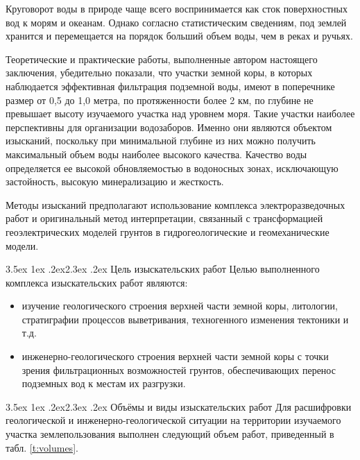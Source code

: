 \documentclass[a4paper,12pt]{article} %
\makeatletter
\renewcommand\section{\@startsection {section}{1}{\parindent}%
	{3.5ex \@plus 1ex \@minus .2ex}{2.3ex \@plus.2ex}%
	{\normalfont\hyphenpenalty=10000\Large\bfseries}}
\makeatother
\begin{document}
Круговорот воды в природе чаще всего воспринимается как сток поверхностных вод к морям и океанам. Однако согласно статистическим сведениям, под землей хранится и перемещается на порядок больший объем воды, чем в реках и ручьях.

Теоретические и практические работы, выполненные автором настоящего заключения, убедительно показали, что участки земной коры, в которых наблюдается эффективная фильтрация подземной воды, имеют в поперечнике размер от 0,5 до 1,0 метра, по протяженности более 2 км, по глубине не превышает высоту изучаемого участка над уровнем моря. Такие участки наиболее перспективны для организации водозаборов. Именно они являются объектом изысканий, поскольку при минимальной глубине из них можно получить максимальный объем воды наиболее высокого качества. Качество воды определяется ее высокой обновляемостью в водоносных зонах, исключающую застойность, высокую минерализацию и жесткость.

Методы изысканий предполагают использование комплекса электроразведочных работ и оригинальный метод интерпретации, связанный с трансформацией геоэлектрических моделей грунтов в гидрогеологические и геомеханические модели.

\section{Цель изыскательских работ}
Целью выполненного комплекса изыскательских работ являются:
\begin{itemize}
	\item изучение геологического строения верхней части земной коры, литологии, стратиграфии процессов выветривания, техногенного изменения тектоники и т.д.
	\item инженерно-геологического строения верхней части земной коры с точки зрения фильтрационных возможностей грунтов, обеспечивающих перенос подземных вод к местам их разгрузки.
\end{itemize}


\section{Объёмы и виды изыскательских работ}
Для расшифровки геологической и инженерно-геологической ситуации на территории изучаемого участка землепользования выполнен следующий объем работ, приведенный в табл. {\ref{t:volumes}}.
\end{document}
